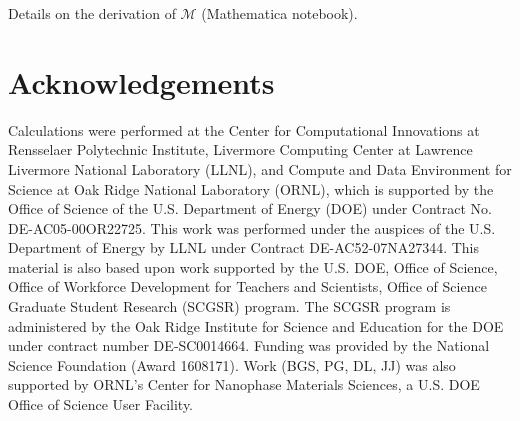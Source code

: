 \documentclass{article}
\begin{document}
\noindent Details on the derivation of $\mathcal{M}$ (Mathematica notebook).


\section{Acknowledgements}
\label{sec:acknowledgements}

Calculations were performed at the Center for Computational Innovations at
Rensselaer Polytechnic Institute, Livermore Computing Center at Lawrence
Livermore National Laboratory (LLNL), and Compute and Data Environment for
Science at Oak Ridge National Laboratory (ORNL), which is supported by the
Office of Science of the U.S. Department of Energy (DOE) under Contract No.
DE-AC05-00OR22725.
This work was performed under the auspices of the U.S. Department of Energy by
LLNL under Contract DE-AC52-07NA27344.
This material is also based upon work supported by the U.S. DOE, Office of
Science, Office of Workforce Development for Teachers and Scientists, Office of
Science Graduate Student Research (SCGSR) program.
The SCGSR program is administered by the Oak Ridge Institute for Science and
Education for the DOE under contract number DE‐SC0014664.
Funding was provided by the National Science Foundation (Award 1608171).  Work
(BGS, PG, DL, JJ) was also supported by ORNL's Center for Nanophase Materials
Sciences, a U.S. DOE Office of Science User Facility.



% 
\end{document}
